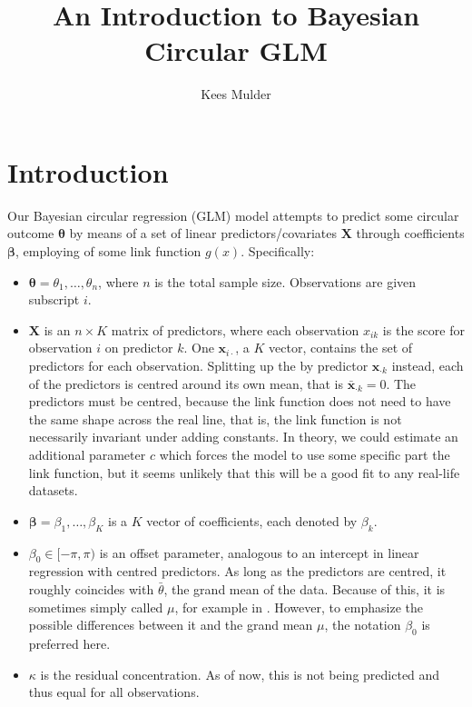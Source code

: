 \documentclass{article}\usepackage[]{graphicx}\usepackage[]{color}
\title{An Introduction to Bayesian Circular GLM}
\author{Kees Mulder}
\begin{document}
\maketitle
\tableofcontents
\section{Introduction}

Our Bayesian circular regression (GLM) model attempts to predict some circular outcome $\boldsymbol\theta$ by means of a set of linear predictors/covariates $\boldsymbol{X}$ through coefficients $\boldsymbol\beta$, employing of some link function $g(x)$. Specifically:

\begin{itemize}

\item $\boldsymbol\theta = \theta_1, \dots, \theta_n$, where $n$ is the total sample size. Observations are given subscript $i$.
\item $\boldsymbol{X}$ is an $n \times K$ matrix of predictors, where each observation $x_{ik}$ is the score for observation $i$ on predictor $k$. One $\boldsymbol{x}_{i \cdot}$, a $K$ vector,  contains the set of predictors for each observation. Splitting up the by predictor $\boldsymbol{x}_{\cdot k}$ instead, each of the predictors is centred around its own mean, that is $\bar{\boldsymbol{x}}_{\cdot k} = 0$. The predictors must be centred, because the link function does not need to have the same shape across the real line, that is, the link function is not necessarily invariant under adding constants. In theory, we could estimate an additional parameter $c$ which forces the model to use some specific part the link function, but it seems unlikely that this will be a good fit to any real-life datasets.
\item $\boldsymbol\beta = \beta_1, \dots, \beta_K$ is a $K$ vector of coefficients, each denoted by $\beta_k$.
\item $ \beta_0 \in [-\pi, \pi) $ is an offset parameter, analogous to an intercept in linear regression with centred predictors. As long as the predictors are centred, it roughly coincides with $\bar\theta$, the grand mean of the data. Because of this, it is sometimes simply called $\mu$, for example in \citet{fisher1992regression}. However, to emphasize the possible differences between it and the grand mean $\mu$, the notation $\beta_0$ is preferred here.
\item $\kappa$ is the residual concentration. As of now, this is not being predicted and thus equal for all observations.

\end{itemize}
\end{document}
